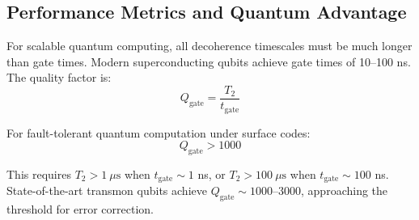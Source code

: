 \documentclass{article}
\begin{document}
\subsection{Performance Metrics and Quantum Advantage}

For scalable quantum computing, all decoherence timescales must be much longer than gate times. Modern superconducting qubits achieve gate times of 10--100 ns. The quality factor is:
$$Q_{\text{gate}} = \frac{T_2}{t_{\text{gate}}}$$

For fault-tolerant quantum computation under surface codes:
$$Q_{\text{gate}} > 1000$$

This requires $T_2 > 1~\mu\text{s}$ when $t_{\text{gate}} \sim 1$ ns, or $T_2 > 100~\mu\text{s}$ when $t_{\text{gate}} \sim 100$ ns. State-of-the-art transmon qubits achieve $Q_{\text{gate}} \sim 1000$--$3000$, approaching the threshold for error correction.
\end{document}
